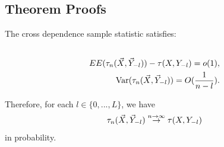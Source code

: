\subsection{Theorem Proofs}
\begin{theorem}
     The cross dependence sample statistic satisfies:
    \begin{align*}
     \\EE(\tau_{n}(\vec{X}, \vec{Y}_{-l})) - \tau(X, Y_{-l}) = o(1),\\
     \text{Var}(\tau_{n}(\vec{X}, \vec{Y}_{-l}))  = O(\frac{1}{n-l}).
     \end{align*}

     Therefore, for each $l \in \{0,...,L\}$, we have
     \begin{align*}
     \tau_{n}(\vec{X}, \vec{Y}_{-l}) \stackrel{n \rightarrow \infty}{\rightarrow} \tau(X, Y_{-l})
     \end{align*}
     in probability.
\end{theorem}

